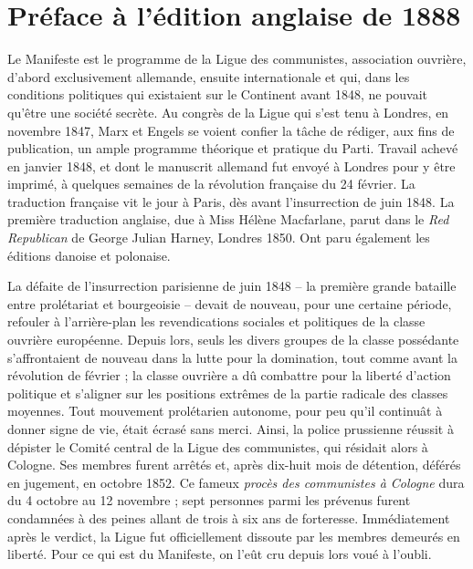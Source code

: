 \documentclass[french,twoside]{book} %
\begin{document}
\section[Préface à l’édition anglaise de 1888]{Préface à l’édition anglaise de 1888}
\noindent Le Manifeste est le programme de la Ligue des communistes, association ouvrière, d’abord exclusivement allemande, ensuite internationale et qui, dans les conditions politiques qui existaient sur le Continent avant 1848, ne pouvait qu’être une société secrète. Au congrès de la Ligue qui s’est tenu à Londres, en novembre 1847, Marx et Engels se voient confier la tâche de rédiger, aux fins de publication, un ample programme théorique et pratique du Parti. Travail achevé en janvier 1848, et dont le manuscrit allemand fut envoyé à Londres pour y être imprimé, à quelques semaines de la révolution française du 24 février. La traduction française vit le jour à Paris, dès avant l’insurrection de juin 1848. La première traduction anglaise, due à Miss Hélène Macfarlane, parut dans le \emph{Red Republican} de George Julian Harney, Londres 1850. Ont paru également les éditions danoise et polonaise.\par
La défaite de l’insurrection parisienne de juin 1848 – la première grande bataille entre prolétariat et bourgeoisie – devait de nouveau, pour une certaine période, refouler à l’arrière-plan les revendications sociales et politiques de la classe ouvrière européenne. Depuis lors, seuls les divers groupes de la classe possédante s’affrontaient de nouveau dans la lutte pour la domination, tout comme avant la révolution de février ; la classe ouvrière a dû combattre pour la liberté d’action politique et s’aligner sur les positions extrêmes de la partie radicale des classes moyennes. Tout mouvement prolétarien autonome, pour peu qu’il continuât à donner signe de vie, était écrasé sans merci. Ainsi, la police prussienne réussit à dépister le Comité central de la Ligue des communistes, qui résidait alors à Cologne. Ses membres furent arrêtés et, après dix-huit mois de détention, déférés en jugement, en octobre 1852. Ce fameux \emph{procès des communistes à Cologne} dura du 4 octobre au 12 novembre ; sept personnes parmi les prévenus furent condamnées à des peines allant de trois à six ans de forteresse. Immédiatement après le verdict, la Ligue fut officiellement dissoute par les membres demeurés en liberté. Pour ce qui est du Manifeste, on l’eût cru depuis lors voué à l’oubli.\par
\end{document}
